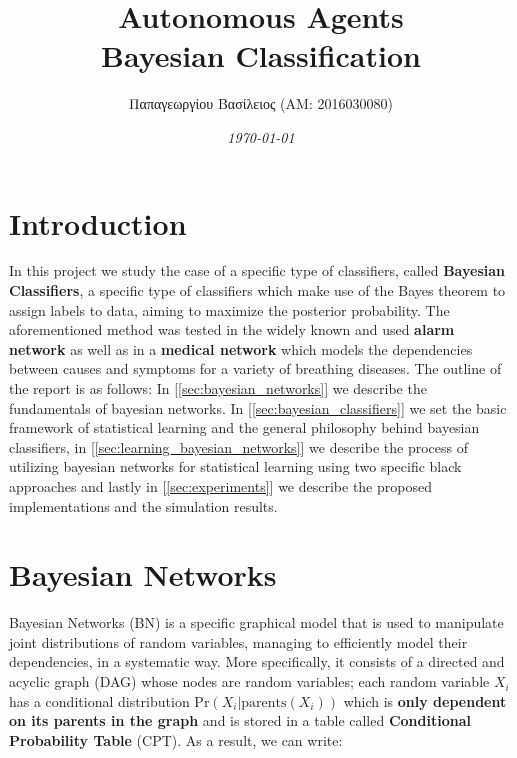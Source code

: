 \documentclass[11pt]{article}
\newcommand{\en}{\selectlanguage{english}}
\newcommand{\gr}{\selectlanguage{greek}}
\begin{document}

	\begin{titlepage}
		\title{
			{\Huge \textbf{Autonomous Agents}} \\
		\vspace{10mm}
		{\Large {Bayesian Classification
	}}} 
		\author{\gr Παπαγεωργίου Βασίλειος (ΑΜ: 2016030080) \en}
		\date{\textit{\today}}
		\maketitle
		\newpage
		\tableofcontents
		\newpage
	\end{titlepage}
	
	\section{Introduction}
	In this project we study the case of a specific type of classifiers, called \textbf{Bayesian Classifiers}, a specific type of classifiers which make use of the Bayes theorem to assign labels to data, aiming to maximize the posterior probability. The aforementioned method was tested in the widely known and used \textbf{alarm network} as well as in a \textbf{medical network} which models the dependencies between causes and symptoms for a variety of breathing diseases. The outline of the report is as follows: In [\ref{sec:bayesian_networks}] we describe the fundamentals of bayesian networks. In [\ref{sec:bayesian_classifiers}] we set the basic framework of statistical learning and the general philosophy behind bayesian classifiers, in [\ref{sec:learning_bayesian_networks}] we describe the process of utilizing bayesian networks for statistical learning using two specific black approaches and lastly in [\ref{sec:experiments}] we describe the proposed implementations and the simulation results.
	
	\section{Bayesian Networks \label{sec:bayesian_networks}}
	Bayesian Networks (BN) is a specific graphical model that is used to manipulate joint distributions of random variables, managing to efficiently model their dependencies, in a systematic way. More specifically, it consists of a directed and acyclic graph (DAG) whose nodes are random variables; each random variable $X_i$ has a conditional distribution $\text{Pr}(X_i | \text{parents}(X_i))$ which is \textbf{only dependent on its parents in the graph} and is stored in a table called \textbf{Conditional Probability Table} (CPT). As a result, we can write:
	
\end{document}
